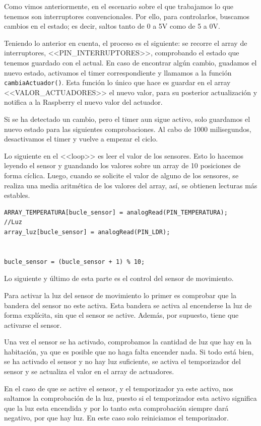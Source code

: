 Como vimos anteriormente, en el escenario sobre el que trabajamos lo que tenemos son interruptores convencionales. Por ello, para controlarlos, buscamos cambios en el estado; es decir, saltos tanto de 0 a 5V como de 5 a 0V. 

Teniendo lo anterior en cuenta, el proceso es el siguiente: se recorre el array de interruptores, <<PIN\_INTERRUPTORES>>, comprobando el estado que tenemos guardado con el actual. En caso de encontrar algún cambio, guadamos el nuevo estado, activamos el timer correspondiente y llamamos a la función \lstinline|cambiaActuador()|. Esta función lo único que hace es guardar en el array <<VALOR\_ACTUADORES>> el nuevo valor, para su posterior actualización y notifica a la Raspberry el nuevo valor del actuador.


Si se ha detectado un cambio, pero el timer aun sigue activo, solo guardamos el nuevo estado para las siguientes comprobaciones. Al cabo de 1000 milisegundos, desactivamos el timer y vuelve a empezar el ciclo.

Lo siguiente en el <<loop>> es leer el valor de los sensores. Esto lo hacemos leyendo el sensor y guandando los valores sobre un array de 10 posiciones de forma cíclica. Luego, cuando se solicite el valor de alguno de los sensores, se realiza una media aritmética de los valores del array, así, se obtienen lecturas más estables.

\begin{lstlisting}
ARRAY_TEMPERATURA[bucle_sensor] = analogRead(PIN_TEMPERATURA);
//Luz
array_luz[bucle_sensor] = analogRead(PIN_LDR);


bucle_sensor = (bucle_sensor + 1) % 10;
\end{lstlisting}


Lo siguiente y último de esta parte es el control del sensor de movimiento. 

Para activar la luz del sensor de movimiento lo primer es comprobar que la bandera del sensor no este activa. Esta bandera se activa al encenderse la luz de forma explícita, sin que el sensor se active. Además, por supuesto, tiene que activarse el sensor.

Una vez el sensor se ha activado, comprobamos la cantidad de luz que hay en la habitación, ya que es posible que no haga falta encender nada. Si todo está bien, se ha activado el sensor y no hay luz suficiente, se activa el temporizador del sensor y se actualiza el valor en el array de actuadores.

En el caso de que se active el sensor, y el temporizador ya este activo, nos saltamos la comprobación de la luz, puesto si el temporizador esta activo significa que la luz esta encendida y por lo tanto esta comprobación siempre dará negativo, por que hay luz. En este caso solo reiniciamos el temporizador.

